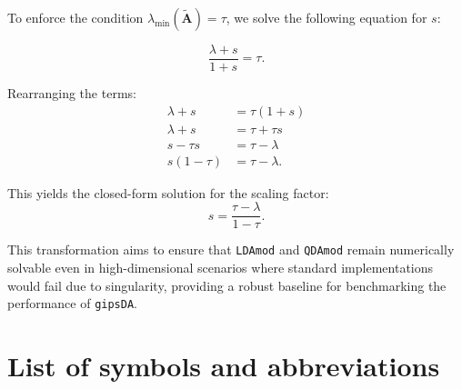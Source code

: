 \documentclass[a4paper,11pt,twoside]{report}
\theoremstyle{definition}
\begin{document}
To enforce the condition $\lambda_{\min}(\tilde{\mathbf{A}}) = \tau$, we solve the following equation for $s$:

\begin{equation}
    \frac{\lambda + s}{1 + s} = \tau.
\end{equation}

Rearranging the terms:
\begin{align*}
    \lambda + s &= \tau(1 + s) \\
    \lambda + s &= \tau + \tau s \\
    s - \tau s &= \tau - \lambda \\
    s(1 - \tau) &= \tau - \lambda.
\end{align*}

This yields the closed-form solution for the scaling factor:
\begin{equation}
    s = \frac{\tau - \lambda}{1 - \tau}.
\end{equation}

This transformation aims to ensure that \texttt{LDAmod} and \texttt{QDAmod} remain numerically solvable even in high-dimensional scenarios where standard implementations would fail due to singularity, providing a robust baseline for benchmarking the performance of \texttt{gipsDA}.




\chapter*{List of symbols and abbreviations}
\end{document}
